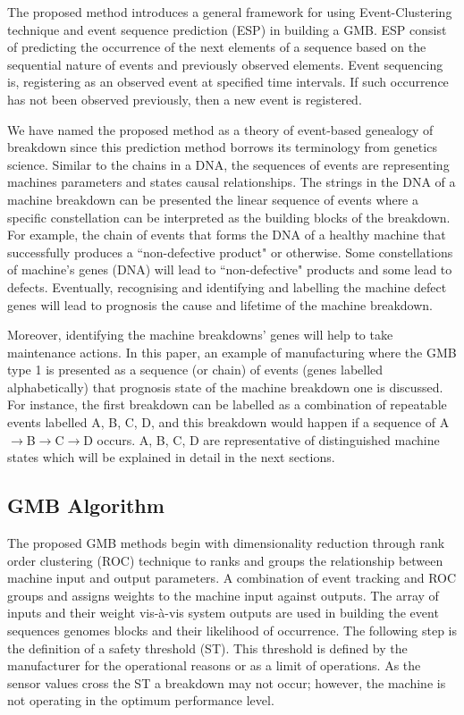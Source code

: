 \documentclass[conference]{IEEEtran}
\begin{document}
The proposed method introduces a general framework for using Event-Clustering technique \cite{Danishvar2018} and event sequence prediction (ESP) in building a GMB. ESP consist of predicting the occurrence of the next elements of a sequence based on the sequential nature of events and previously observed elements. Event sequencing is, registering as an observed event at specified time intervals. If such occurrence has not been observed previously, then a new event is registered. 

We have named the proposed method as a theory of event-based genealogy of breakdown since this prediction method borrows its terminology from genetics science. Similar to the chains in a DNA, the sequences of events are representing machines parameters and states causal relationships. The strings in the DNA of a machine breakdown can be presented the linear sequence of events where a specific constellation can be interpreted as the building blocks of the breakdown. For example, the chain of events that forms the DNA of a healthy machine that successfully produces a ``non-defective product" or otherwise. Some constellations of machine's genes (DNA) will lead to ``non-defective" products and some lead to defects. Eventually, recognising and identifying and labelling the machine defect genes will lead to prognosis the cause and lifetime of the machine breakdown.

Moreover, identifying the machine breakdowns' genes will help to take maintenance actions. In this paper, an example of manufacturing where the GMB type 1 is presented as a sequence (or chain) of events (genes labelled alphabetically) that prognosis state of the machine breakdown one is discussed. For instance, the first breakdown can be labelled as a combination of repeatable events labelled A, B, C, D, and this breakdown would happen if a sequence of A$\to$B$\to$C$\to$D occurs. A, B, C, D are representative of distinguished machine states which will be explained in detail in the next sections.

\subsection{GMB Algorithm}
\label{subsec:GMB_Algorithm}
The proposed GMB methods begin with dimensionality reduction through rank order clustering (ROC) technique to ranks and groups the relationship between machine input and output parameters. A combination of event tracking \cite{Tavakoli2013} and ROC \cite{Danishvar2018} groups and assigns weights to the machine input against outputs. The array of inputs and their weight vis-à-vis system outputs are used in building the event sequences genomes blocks and their likelihood of occurrence. The following step is the definition of a safety threshold (ST). This threshold is defined by the manufacturer for the operational reasons or as a limit of operations. As the sensor values cross the ST a breakdown may not occur; however, the machine is not operating in the optimum performance level.
\end{document}
